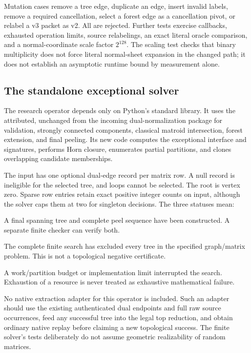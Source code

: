 Mutation cases remove a tree edge, duplicate an edge, insert invalid
labels, remove a required cancellation, select a forest edge as a
cancellation pivot, or relabel a v3 packet as v2.  All are rejected.
Further tests exercise callbacks, exhausted operation limits, source
relabelings, an exact literal oracle comparison, and a normal-coordinate
scale factor $2^{128}$.  The scaling test checks that binary multiplicity
does not force literal normal-sheet expansion in the changed path; it
does not establish an asymptotic runtime bound by measurement alone.

\subsection{The standalone exceptional solver}

The research operator  depends only on
Python's standard library.  It uses the attributed, unchanged
 from the incoming dual-normalization
package for validation, strongly connected components, classical matroid
intersection, forest extension, and final peeling.  Its new code computes
the exceptional interface and signatures, performs Horn closure,
enumerates partial partitions, and clones overlapping candidate
memberships.

The input has one optional dual-edge record per matrix row.  A null
record is ineligible for the selected tree, and loops cannot be selected.
The root is vertex zero.  Sparse row entries retain exact positive integer
counts on input, although the solver caps them at two for singleton
decisions.  The three statuses mean:
\begin{description}[style=nextline]
\item[\code{SUCCESS}] A final spanning tree and complete peel sequence
have been constructed.  A separate finite checker can verify both.
\item[\code{NO\_FOREST}] The complete finite search has excluded every
tree in the specified graph/matrix problem.  This is not a topological
negative certificate.
\item[\code{INCONCLUSIVE}] A work/partition budget or implementation
limit interrupted the search.  Exhaustion of a resource is never treated
as exhaustive mathematical failure.
\end{description}

No native extraction adapter for this operator is included.  Such an
adapter should use the existing authenticated dual endpoints and full
raw source occurrences, feed any successful tree into the legal top
reduction, and obtain ordinary native replay before claiming a new
topological success.  The finite solver's tests deliberately do not
assume geometric realizability of random matrices.

